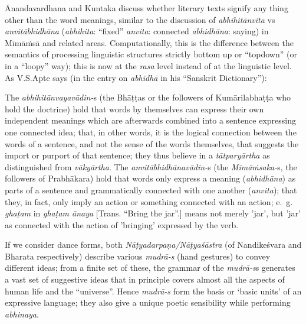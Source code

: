 Ānandavardhana and Kuntaka discuss whether literary texts signify any thing other than the word meanings, similar to the discussion of \textsl{abhihitānvita} vs \textsl{anvitābhidhāna} (\textsl{abhihita}: “fixed” \textsl{anvita}: connected \textsl{abhidhāna}: saying) in Mīmāṁsā and related areas. Computationally, this is the difference between the semantics of processing linguistic structures strictly bottom up or “topdown” (or in a “loopy” way); this is now at the \textsl{rasa} level instead of at the linguistic level. As V.S.Apte says (in the entry on \textsl{abhidhā} in his “Sanskrit Dictionary”):
\begin{myquote}
The \textsl{abhihitānvayavādin-}s (the Bhāṭṭas or the followers of Kumārilabhaṭṭa who hold the doctrine) hold that words by themselves can express their own independent meanings which are afterwards combined into a sentence expressing one connected idea; that, in other words, it is the logical connection between the words of a sentence, and not the sense of the words themselves, that suggests the import or purport of that sentence; they thus believe in a \textsl{tātparyārtha} as distinguished from \textsl{vākyārtha}. The \textsl{anvitābhidhānavādin-}s (the \textsl{Mīmāṁsaka-}s, the followers of Prabhākara) hold that words only express a meaning (\textsl{abhidhāna}) as parts of a sentence and grammatically connected with one another (\textsl{anvita}); that they, in fact, only imply an action or something connected with an action; e.~g. \textsl{ghaṭam} in \textsl{ghaṭam ānaya} [Trans. “Bring the jar”.] means not merely 'jar', but 'jar' as connected with the action of 'bringing' expressed by the verb.
\end{myquote}

If we consider dance forms, both \textsl{Nāṭyadarpaṇa/Nāṭyaśāstra} (of Nandikeśvara and Bharata respectively) describe various \textsl{mudrā-s} (hand gestures) to convey different ideas; from a finite set of these, the grammar of the \textsl{mudrā-s}s generates a vast set of suggestive ideas that in principle covers almost all the aspects of human life and the “universe”. Hence \textsl{mudrā-s} form the basis or ‘basic units’ of an expressive language; they also give a unique poetic sensibility while performing \textsl{abhinaya}.

